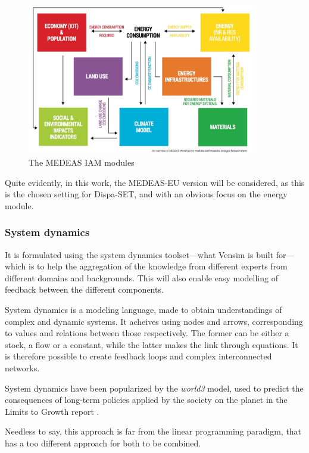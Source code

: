\begin{figure}[h]
    \centering
    \includegraphics[width=0.9\textwidth]{resources/images/medeas.png}
    \caption{The MEDEAS IAM modules}
    \label{fig:medeas-modules}
\end{figure}

Quite evidently, in this work, the MEDEAS-EU version will be considered, as this is the chosen setting for Dispa-SET, and with an obvious focus on the energy module. 

\subsubsection{System dynamics}

It is formulated using the system dynamics toolset---what Vensim is built for---which is to help the aggregation of the knowledge from different experts from different domains and backgrounds. This will also enable easy modelling of feedback between the different components.

System dynamics is a modeling language, made to obtain understandings of complex and dynamic systems. It acheives using nodes and arrows, corresponding to values and relations between those respectively. The former can be either a stock, a flow or a constant, while the latter makes the link through equations. It is therefore possible to create feedback loops and complex interconnected networks.

System dynamics have been popularized by the \textit{world3} model, used to predict the consequences of long-term policies applied by the society on the planet in the Limits to Growth report \cite{limits-to-growth}.

Needless to say, this approach is far from the linear programming paradigm, that has a too different approach for both to be combined.

